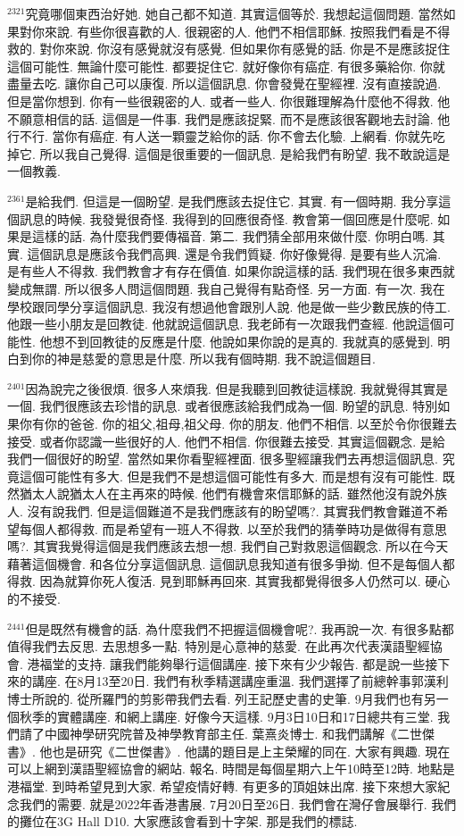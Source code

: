 \documentclass{book}
\begin{document}
$^{2321}$究竟哪個東西治好她.
她自己都不知道.
其實這個等於.
我想起這個問題.
當然如果對你來說.
有些你很喜歡的人.
很親密的人.
他們不相信耶穌.
按照我們看是不得救的.
對你來說.
你沒有感覺就沒有感覺.
但如果你有感覺的話.
你是不是應該捉住這個可能性.
無論什麼可能性.
都要捉住它.
就好像你有癌症.
有很多藥給你.
你就盡量去吃.
讓你自己可以康復.
所以這個訊息.
你會發覺在聖經裡.
沒有直接說過.
但是當你想到.
你有一些很親密的人.
或者一些人.
你很難理解為什麼他不得救.
他不願意相信的話.
這個是一件事.
我們是應該捉緊.
而不是應該很客觀地去討論.
他行不行.
當你有癌症.
有人送一顆靈芝給你的話.
你不會去化驗.
上網看.
你就先吃掉它.
所以我自己覺得.
這個是很重要的一個訊息.
是給我們有盼望.
我不敢說這是一個教義.

$^{2361}$是給我們.
但這是一個盼望.
是我們應該去捉住它.
其實.
有一個時期.
我分享這個訊息的時候.
我發覺很奇怪.
我得到的回應很奇怪.
教會第一個回應是什麼呢.
如果是這樣的話.
為什麼我們要傳福音.
第二.
我們猜全部用來做什麼.
你明白嗎.
其實.
這個訊息是應該令我們高興.
還是令我們質疑.
你好像覺得.
是要有些人沉淪.
是有些人不得救.
我們教會才有存在價值.
如果你說這樣的話.
我們現在很多東西就變成無謂.
所以很多人問這個問題.
我自己覺得有點奇怪.
另一方面.
有一次.
我在學校跟同學分享這個訊息.
我沒有想過他會跟別人說.
他是做一些少數民族的侍工.
他跟一些小朋友是回教徒.
他就說這個訊息.
我老師有一次跟我們查經.
他說這個可能性.
他想不到回教徒的反應是什麼.
他說如果你說的是真的.
我就真的感覺到.
明白到你的神是慈愛的意思是什麼.
所以我有個時期.
我不說這個題目.

$^{2401}$因為說完之後很煩.
很多人來煩我.
但是我聽到回教徒這樣說.
我就覺得其實是一個.
我們很應該去珍惜的訊息.
或者很應該給我們成為一個.
盼望的訊息.
特別如果你有你的爸爸.
你的祖父,祖母,祖父母.
你的朋友.
他們不相信.
以至於令你很難去接受.
或者你認識一些很好的人.
他們不相信.
你很難去接受.
其實這個觀念.
是給我們一個很好的盼望.
當然如果你看聖經裡面.
很多聖經讓我們去再想這個訊息.
究竟這個可能性有多大.
但是我們不是想這個可能性有多大.
而是想有沒有可能性.
既然猶太人說猶太人在主再來的時候.
他們有機會來信耶穌的話.
雖然他沒有說外族人.
沒有說我們.
但是這個難道不是我們應該有的盼望嗎?.
其實我們教會難道不希望每個人都得救.
而是希望有一班人不得救.
以至於我們的猜拳時功是做得有意思嗎?.
其實我覺得這個是我們應該去想一想.
我們自己對救恩這個觀念.
所以在今天藉著這個機會.
和各位分享這個訊息.
這個訊息我知道有很多爭拗.
但不是每個人都得救.
因為就算你死人復活.
見到耶穌再回來.
其實我都覺得很多人仍然可以.
硬心的不接受.

$^{2441}$但是既然有機會的話.
為什麼我們不把握這個機會呢?.
我再說一次.
有很多點都值得我們去反思.
去思想多一點.
特別是心意神的慈愛.
在此再次代表漢語聖經協會.
港福堂的支持.
讓我們能夠舉行這個講座.
接下來有少少報告.
都是說一些接下來的講座.
在8月13至20日.
我們有秋季精選講座重溫.
我們選擇了前總幹事郭漢利博士所說的.
從所羅門的剪影帶我們去看.
列王記歷史書的史筆.
9月我們也有另一個秋季的實體講座.
和網上講座.
好像今天這樣.
9月3日10日和17日總共有三堂.
我們請了中國神學研究院普及神學教育部主任.
葉熹炎博士.
和我們講解《二世傑書》.
他也是研究《二世傑書》.
他講的題目是上主榮耀的同在.
大家有興趣.
現在可以上網到漢語聖經協會的網站.
報名.
時間是每個星期六上午10時至12時.
地點是港福堂.
到時希望見到大家.
希望疫情好轉.
有更多的頂姐妹出席.
接下來想大家紀念我們的需要.
就是2022年香港書展.
7月20日至26日.
我們會在灣仔會展舉行.
我們的攤位在3G Hall D10.
大家應該會看到十字架.
那是我們的標誌.
\end{document}
